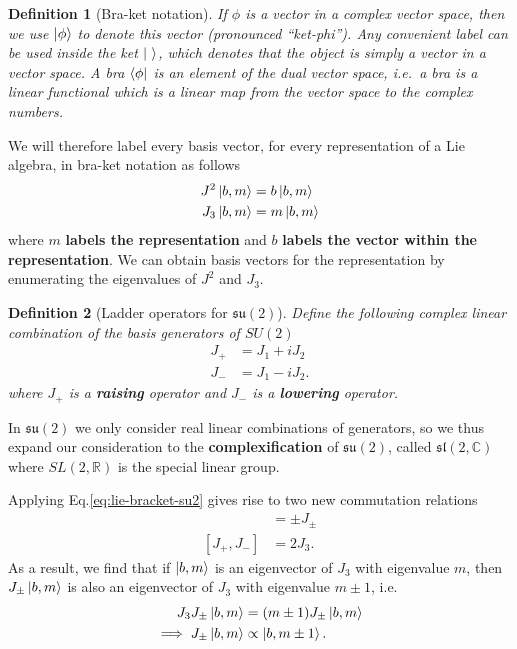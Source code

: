 \documentclass[11pt]{article}
\numberwithin{equation}{section}
\newtheorem{defn}{Definition}[section]
\begin{document}
\begin{defn}[Bra-ket notation] 
If $\phi$ is a vector in a complex vector space, then we use $\ket{\phi}$ to denote this vector (pronounced ``ket-phi''). Any convenient label can be used inside the ket $\ket{\ }$, which denotes that the object is simply a vector in a vector space. A bra $\bra{\phi}$ is an element of the dual vector space, i.e.\ a bra is a linear functional which is a linear map from the vector space to the complex numbers. 
\end{defn}

We will therefore label every basis vector, for every representation of a Lie algebra, in bra-ket notation as follows
\begin{align}
J^2 \ket{b, m} &= b \ket{b, m} \nonumber \\
J_3 \ket{b, m} &= m \ket{b, m}
\end{align}
where $m$ \textbf{labels the representation} and $b$ \textbf{labels the vector within the representation}. We can obtain basis vectors for the representation by enumerating the eigenvalues of $J^2$ and $J_3$. 

\begin{defn}[Ladder operators for $\mathfrak{su}(2)$]
Define the following complex linear combination of the basis generators of $SU(2)$
\begin{align}
J_+ &= J_1 + i J_2 \\
J_- &= J_1 - i J_2. \label{eq:ladder-operators-su2}
\end{align}
where $J_+$ is a \textbf{raising} operator and $J_-$ is a \textbf{lowering} operator.
\end{defn}
In $\mathfrak{su(2)}$ we only consider real linear combinations of generators, so we thus expand our consideration to the \textbf{complexification} of $\mathfrak{su}(2)$, called $\mathfrak{sl}(2, \mathbb{C})$ where $SL(2,\mathbb{R})$ is the special linear group.

Applying Eq.\eqref{eq:lie-bracket-su2} gives rise to two new commutation relations
\begin{align}
[J_3, J_{\pm}] &= \pm J_{\pm} \\
[J_+, J_-] &= 2 J_3.
\end{align}
As a result, we find that if $\ket{b,m}$ is an eigenvector of $J_3$ with eigenvalue $m$, then $J_{\pm}\ket{b,m}$ is also an eigenvector of $J_3$ with eigenvalue $m \pm 1$, i.e.
\begin{align}
J_3 J_{\pm}\ket{b,m} &= (m \pm 1) J_{\pm}\ket{b,m} \\
\implies J_{\pm}\ket{b,m} &\propto \ket{b,m \pm 1}. \label{eq:ladder_propto_m_pm_1}
\end{align}
\end{document}
